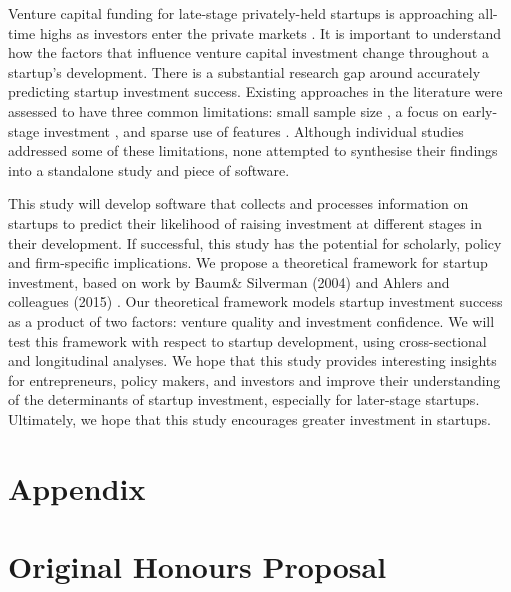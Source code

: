 \documentclass[../thesis/thesis.tex]{subfiles}
\begin{document}
Venture capital funding for late-stage privately-held startups is approaching all-time highs as investors enter the private markets \cite{nvca2016}. It is important to understand how the factors that influence venture capital investment change throughout a startup's development. There is a substantial research gap around accurately predicting startup investment success. Existing approaches in the literature were assessed to have three common limitations: small sample size \cite{ahlers2015, conti2013, gimmon2010, dixon2014, hoenen2014, yu2015, an2015, werth2013, croce2016}, a focus on early-stage investment \cite{beckwith2016, ahlers2015, cheng2016, yuan2016, croce2016}, and sparse use of features \cite{ahlers2015, an2015, cheng2016, croce2016, werth2013, gimmon2010}. Although individual studies addressed some of these limitations, none attempted to synthesise their findings into a standalone study and piece of software.


This study will develop software that collects and processes information on startups to predict their likelihood of raising investment at different stages in their development. If successful, this study has the potential for scholarly, policy and firm-specific implications. We propose a theoretical framework for startup investment, based on work by Baum\& Silverman (2004) \cite{baum2004} and Ahlers and colleagues (2015) \cite{ahlers2015}. Our theoretical framework models startup investment success as a product of two factors: venture quality and investment confidence. We will test this framework with respect to startup development, using cross-sectional and longitudinal analyses. We hope that this study provides interesting insights for entrepreneurs, policy makers, and investors and improve their understanding of the determinants of startup investment, especially for later-stage startups. Ultimately, we hope that this study encourages greater investment in startups.

{
    \appendix

    \chapter{Appendix}
    

    \chapter{Original Honours Proposal}
    

    
}
\end{document}
